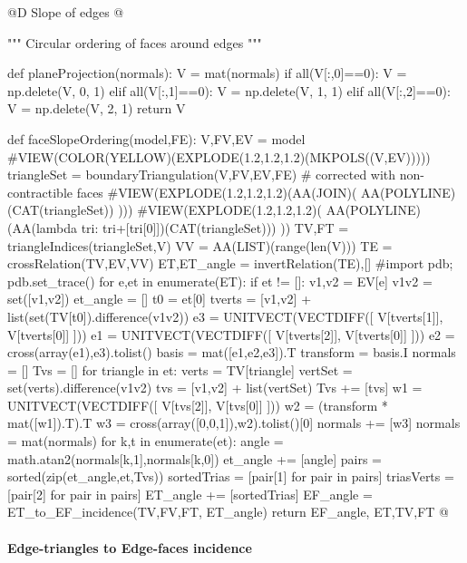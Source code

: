 \documentclass[11pt,oneside]{article}    %
\begin{document}
@D Slope of edges
@{""" Circular ordering of faces around edges """

def planeProjection(normals):
    V = mat(normals)
    if all(V[:,0]==0): V = np.delete(V, 0, 1)
    elif all(V[:,1]==0): V = np.delete(V, 1, 1)
    elif all(V[:,2]==0): V = np.delete(V, 2, 1)
    return V

def faceSlopeOrdering(model,FE):
    V,FV,EV = model
    #VIEW(COLOR(YELLOW)(EXPLODE(1.2,1.2,1.2)(MKPOLS((V,EV)))))
    triangleSet = boundaryTriangulation(V,FV,EV,FE) # corrected with non-contractible faces
    #VIEW(EXPLODE(1.2,1.2,1.2)(AA(JOIN)( AA(POLYLINE)(CAT(triangleSet)) )))
    #VIEW(EXPLODE(1.2,1.2,1.2)( AA(POLYLINE)(AA(lambda tri: tri+[tri[0]])(CAT(triangleSet))) ))
    TV,FT = triangleIndices(triangleSet,V) 
    VV = AA(LIST)(range(len(V)))
    TE = crossRelation(TV,EV,VV)
    ET,ET_angle = invertRelation(TE),[]
    #import pdb; pdb.set_trace()
    for e,et in enumerate(ET):
        if et != []:
            v1,v2 = EV[e]
            v1v2 = set([v1,v2])
            et_angle = []
            t0 = et[0]
            tverts = [v1,v2] + list(set(TV[t0]).difference(v1v2))
            e3 = UNITVECT(VECTDIFF([ V[tverts[1]], V[tverts[0]] ]))
            e1 = UNITVECT(VECTDIFF([ V[tverts[2]], V[tverts[0]] ]))
            e2 = cross(array(e1),e3).tolist()
            basis = mat([e1,e2,e3]).T
            transform = basis.I
            normals = []
            Tvs = []
            for triangle in et:
                verts = TV[triangle]
                vertSet = set(verts).difference(v1v2)
                tvs = [v1,v2] + list(vertSet)
                Tvs += [tvs]
                w1 = UNITVECT(VECTDIFF([ V[tvs[2]], V[tvs[0]] ]))
                w2 = (transform * mat([w1]).T).T
                w3 = cross(array([0,0,1]),w2).tolist()[0]
                normals += [w3]
            normals = mat(normals)
            for k,t in enumerate(et):
                angle = math.atan2(normals[k,1],normals[k,0])
                et_angle += [angle]
            pairs = sorted(zip(et_angle,et,Tvs))
            sortedTrias = [pair[1] for pair in pairs]
            triasVerts = [pair[2] for pair in pairs]
            ET_angle += [sortedTrias]
    EF_angle = ET_to_EF_incidence(TV,FV,FT, ET_angle)
    return EF_angle, ET,TV,FT
@}



\paragraph{Edge-triangles to Edge-faces incidence}
\end{document}
